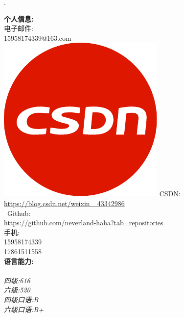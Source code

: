 \documentclass[a4paper,12pt,final,UTF8,fontset=macnew]{memoir}
\newcommand{\myThemeColor}{RoyalBlue}
\newcommand{\CVItem}[1]
	{\textbf{\color{\myThemeColor} #1}}
\begin{document}
\begin{flushright}\footnotesize
.\\
\vskip 6cm
    \raggedright
	\CVItem{{\large \faInfoCircle 个人信息:}}\\
	{
	\textcolor{blue}{\faEnvelope} 电子邮件:\\
	15958174339@163.com \\
	 \includegraphics[scale=0.07]{csdn.pdf} \hspace{-0.3em} CSDN:\\	
	 \href{https://blog.csdn.net/weixin_43342986}{\small https://blog.csdn.net/weixin\_ 43342986 } \\
	\faGithub  \ Github:\\
	\href{https://github.com/neverland-haha?tab=repositories}{\small https://github.com/neverland-haha?tab=repositories}   \\
	\textcolor{red}{\faPhone}手机:\\
	15958174339\\
	17861511558 \\ }
	\vspace{3em}
	\CVItem{{\vspace{-1.2em}\large \faLanguage 语言能力:}}\\
	
	{\textit{\\ 四级:616\\  六级:520\\
		    	四级口语:B\\
		    	六级口语:B+
			}  }
	

\end{flushright}
\end{document}

